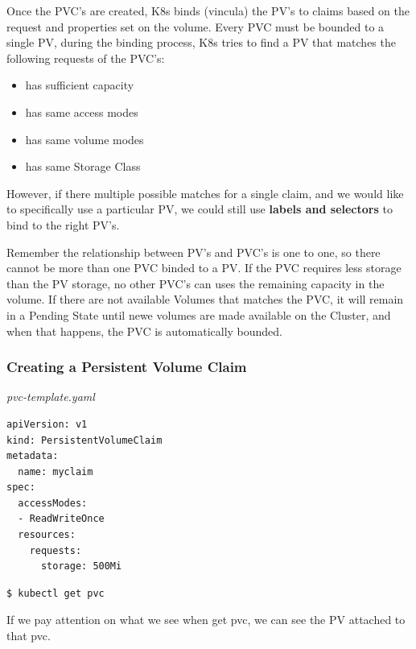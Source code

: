 \documentclass{article}
\newenvironment{blocktemplate}[1]{%
    \tcolorbox[beamer,%
    noparskip,breakable,
    colframe=Blue,%
    colbacklower=LimeGreen!75!LightGreen,%
    title=#1]}%
    {\endtcolorbox}
\newenvironment{blocktemplateIII}[1]{%
    \tcolorbox[beamer,%
    noparskip,breakable,
    ,colframe=Red,%
    colbacklower=LimeGreen!75!LightGreen,%
    title=#1]}%
    {\endtcolorbox}
\newenvironment{codetemplate}[1][]{%
  \mybasecolorbox[#1]
  \itshape
}{%
  \endmybasecolorbox
}
\begin{document}
Once the PVC's are created, K8s binds (vincula) the PV's to claims based on the request and properties set on the volume. Every PVC must be bounded to a single PV, during the binding process, K8s tries to find a PV that matches the following requests of the PVC's:

\begin{itemize}
    \item has sufficient capacity
    \item has same access modes
    \item has same volume modes
    \item has same Storage Class
\end{itemize}

However, if there multiple possible matches for a single claim, and we would like to specifically use a particular PV, we could still use \textbf{labels and selectors} to bind to the right PV's.

\begin{blocktemplateIII}{WARNING}
Remember the relationship between PV's and PVC's is one to one, so there cannot be more than one PVC binded to a PV. If the PVC requires less storage than the PV storage, no other PVC's can uses the remaining capacity in the volume. If there are not available Volumes that matches the PVC, it will remain in a Pending State until newe volumes are made available on the Cluster, and when that happens, the PVC is automatically bounded.
\end{blocktemplateIII}

\subsubsection{Creating a Persistent Volume Claim}

\begin{codetemplate}{pvc-template.yaml}
\begin{verbatim}
apiVersion: v1
kind: PersistentVolumeClaim
metadata:
  name: myclaim
spec:
  accessModes:
  - ReadWriteOnce
  resources:
    requests:
      storage: 500Mi
\end{verbatim}
\end{codetemplate}

\begin{codetemplate}{}
\begin{verbatim}
$ kubectl get pvc
\end{verbatim}
\end{codetemplate}

\begin{blocktemplate}{NOTE}
If we pay attention on what we see when get pvc, we can see the PV attached to that pvc.
\end{blocktemplate}
\end{document}
